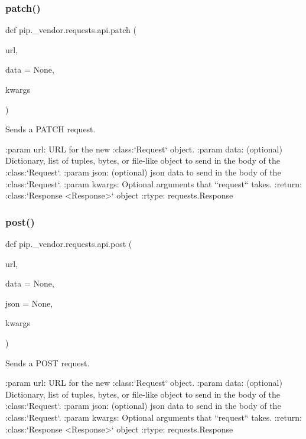 \subsubsection{\texorpdfstring{patch()}{patch()}}
{\footnotesize\ttfamily def pip.\+\_\+vendor.\+requests.\+api.\+patch (\begin{DoxyParamCaption}\item[{}]{url,  }\item[{}]{data = {\ttfamily None},  }\item[{}]{kwargs }\end{DoxyParamCaption})}

\begin{DoxyVerb}Sends a PATCH request.

:param url: URL for the new :class:`Request` object.
:param data: (optional) Dictionary, list of tuples, bytes, or file-like
    object to send in the body of the :class:`Request`.
:param json: (optional) json data to send in the body of the :class:`Request`.
:param \*\*kwargs: Optional arguments that ``request`` takes.
:return: :class:`Response <Response>` object
:rtype: requests.Response
\end{DoxyVerb}
 \mbox{\label{namespacepip_1_1__vendor_1_1requests_1_1api_a5aad530da4fa87d1dd81f6023b1e0cd6}} 
\subsubsection{\texorpdfstring{post()}{post()}}
{\footnotesize\ttfamily def pip.\+\_\+vendor.\+requests.\+api.\+post (\begin{DoxyParamCaption}\item[{}]{url,  }\item[{}]{data = {\ttfamily None},  }\item[{}]{json = {\ttfamily None},  }\item[{}]{kwargs }\end{DoxyParamCaption})}

\begin{DoxyVerb}Sends a POST request.

:param url: URL for the new :class:`Request` object.
:param data: (optional) Dictionary, list of tuples, bytes, or file-like
    object to send in the body of the :class:`Request`.
:param json: (optional) json data to send in the body of the :class:`Request`.
:param \*\*kwargs: Optional arguments that ``request`` takes.
:return: :class:`Response <Response>` object
:rtype: requests.Response
\end{DoxyVerb}
 \mbox{\label{namespacepip_1_1__vendor_1_1requests_1_1api_ac828574a7bbadca5580cf93c1145e99b}} 
